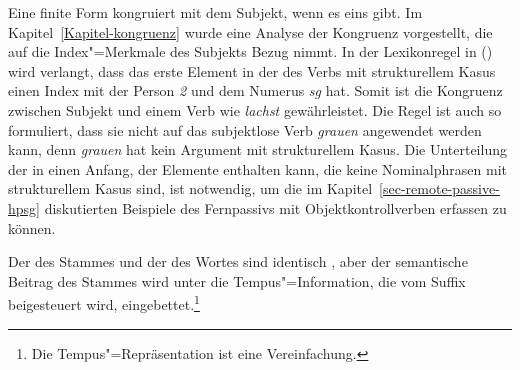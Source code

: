 Eine finite Form kongruiert mit dem Subjekt, wenn es eins gibt. Im Kapitel~\ref{Kapitel-kongruenz}
wurde eine Analyse der Kongruenz vorgestellt, die auf die Index"=Merkmale des Subjekts Bezug nimmt.
In der Lexikonregel in () wird verlangt, dass das erste Element in der \argstl des Verbs mit
strukturellem Kasus einen Index mit der Person \emph{2} und dem Numerus \emph{sg} hat.
Somit ist die Kongruenz zwischen Subjekt und einem Verb wie \emph{lachst} gewährleistet. Die Regel
ist auch so formuliert, dass sie nicht auf das subjektlose Verb \emph{grauen} angewendet werden kann,
denn \emph{grauen} hat kein Argument mit strukturellem Kasus. Die Unterteilung der \argstl in einen
Anfang, der Elemente enthalten kann, die keine Nominalphrasen mit strukturellem Kasus sind, ist
notwendig, um die im Kapitel~\ref{sec-remote-passive-hpsg} diskutierten Beispiele des Fernpassivs mit
Objektkontrollverben erfassen zu können.%

Der \catw des Stammes und der \catw des Wortes sind identisch , aber der semantische
Beitrag des Stammes wird unter die Tempus"=Information, die vom Suffix beigesteuert wird,
eingebettet.\footnote{ 
  Die Tempus"=Repräsentation ist eine Vereinfachung.%
}

